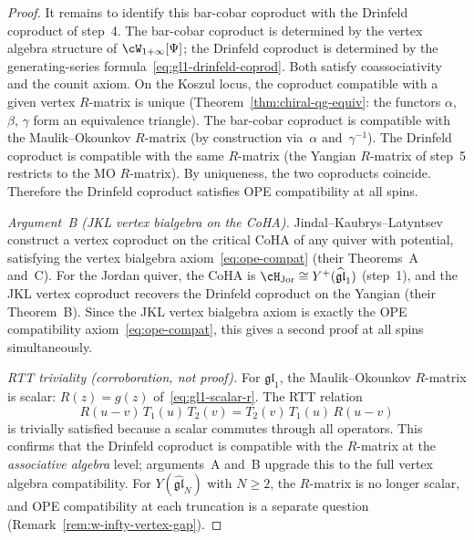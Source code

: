 \begin{proof}
It remains to identify this bar-cobar coproduct with the
Drinfeld coproduct of step~4. The bar-cobar coproduct
is determined by the vertex algebra structure of
$\cW_{1+\infty}[\Psi]$; the Drinfeld coproduct is
determined by the generating-series
formula~\eqref{eq:gl1-drinfeld-coprod}. Both satisfy
coassociativity and the counit axiom. On the Koszul locus,
the coproduct compatible with a given vertex $R$-matrix is
unique (Theorem~\ref{thm:chiral-qg-equiv}: the functors
$\alpha$, $\beta$, $\gamma$ form an equivalence triangle).
The bar-cobar coproduct is compatible with the
Maulik--Okounkov $R$-matrix (by construction via~$\alpha$
and~$\gamma^{-1}$). The Drinfeld coproduct is compatible
with the same $R$-matrix (the Yangian $R$-matrix of
step~5 restricts to the MO $R$-matrix). By uniqueness,
the two coproducts coincide. Therefore the Drinfeld
coproduct satisfies OPE compatibility at all spins.

\smallskip
\noindent\emph{Argument~B \textup{(}JKL vertex bialgebra
on the CoHA\textup{)}.}
Jindal--Kaubrys--Latyntsev~\cite{JKL26} construct a vertex
coproduct on the critical CoHA of any quiver with potential,
satisfying the vertex bialgebra
axiom~\eqref{eq:ope-compat} (their Theorems~A and~C).
For the Jordan quiver, the CoHA is
$\cH_{\mathrm{Jor}} \cong Y^+(\widehat{\mathfrak{gl}}_1)$
(step~1), and the JKL vertex coproduct recovers the
Drinfeld coproduct on the Yangian (their Theorem~B).
Since the JKL vertex bialgebra axiom is exactly the OPE
compatibility axiom~\eqref{eq:ope-compat}, this gives a
second proof at all spins simultaneously.

\smallskip
\noindent\emph{RTT triviality \textup{(}corroboration,
not proof\textup{)}.}
For $\mathfrak{gl}_1$, the Maulik--Okounkov $R$-matrix is
scalar:
$R(z) = g(z)$ of~\eqref{eq:gl1-scalar-r}. The RTT
relation
\begin{equation}\label{eq:rtt-gl1}
  R(u - v)\, T_1(u)\, T_2(v)
  = T_2(v)\, T_1(u)\, R(u - v)
\end{equation}
is trivially satisfied because a scalar commutes through
all operators. This confirms that the Drinfeld coproduct is
compatible with the $R$-matrix at the \emph{associative
algebra} level; arguments~A and~B upgrade this to the
full vertex algebra compatibility.
For $Y(\widehat{\mathfrak{gl}}_N)$ with $N \geq 2$,
the $R$-matrix is no longer scalar, and OPE compatibility
at each truncation is a separate question
(Remark~\ref{rem:w-infty-vertex-gap}).


\end{proof}
